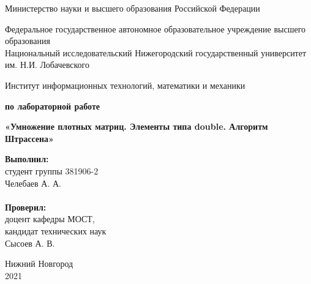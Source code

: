 \documentclass{report}
\begin{document}
\begin{titlepage}

\begin{center}
Министерство науки и высшего образования Российской Федерации
\end{center}

\begin{center}
Федеральное государственное автономное образовательное учреждение высшего образования \\
Национальный исследовательский Нижегородский государственный университет им. Н.И. Лобачевского
\end{center}

\begin{center}
Институт информационных технологий, математики и механики
\end{center}

\vspace{4em}

\begin{center}
\textbf{ по лабораторной работе} \\
\end{center}
\begin{center}
\textbf{\Large«Умножение плотных матриц. Элементы типа double. Алгоритм Штрассена»} \\
\end{center}

\vspace{4em}

\newbox{\lbox}
\newlength{\maxl}
\setlength{\maxl}{\wd\lbox}
\hfill\parbox{7cm}{
\hspace*{5cm}\hspace*{-5cm}\textbf{Выполнил:} \\ студент группы 381906-2 \\ Челебаев А. А.\\
\\
\hspace*{5cm}\hspace*{-5cm}\textbf{Проверил:}\\ доцент кафедры МОСТ, \\ кандидат технических наук \\ Сысоев А. В.\\
}
\vspace{\fill}

\begin{center} Нижний Новгород \\ 2021 \end{center}

\end{titlepage}
\end{document}
